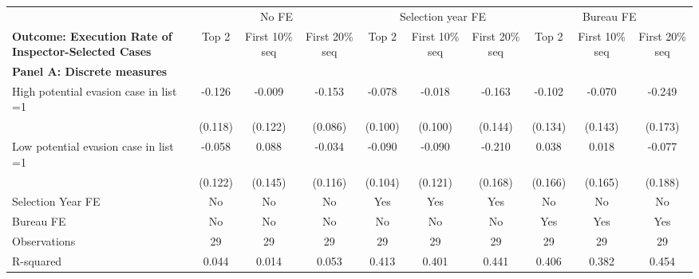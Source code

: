 \begin{tabular}{l*{9}{c}} \toprule
            &\multicolumn{3}{c}{No FE}                                        &\multicolumn{3}{c}{Selection year FE}                            &\multicolumn{3}{c}{Bureau FE}                                    \\\cmidrule(lr){2-4}\cmidrule(lr){5-7}\cmidrule(lr){8-10}
\multicolumn{1}{l}{\textbf{Outcome: Execution Rate of Inspector-Selected Cases}} & Top 2 & First 10\% seq & First 20\% seq & Top 2 & First 10\% seq & First 20\% seq & Top 2 & First 10\% seq & First 20\% seq \\ \midrule \multicolumn{10}{l}{\textbf{Panel A: Discrete measures}}\\ \addlinespace
High potential evasion case in list =1&      -0.126         &      -0.009         &      -0.153\sym{*}  &      -0.078         &      -0.018         &      -0.163         &      -0.102         &      -0.070         &      -0.249         \\
            &     (0.118)         &     (0.122)         &     (0.086)         &     (0.100)         &     (0.100)         &     (0.144)         &     (0.134)         &     (0.143)         &     (0.173)         \\
\addlinespace
Low potential evasion case in list =1&      -0.058         &       0.088         &      -0.034         &      -0.090         &      -0.090         &      -0.210         &       0.038         &       0.018         &      -0.077         \\
            &     (0.122)         &     (0.145)         &     (0.116)         &     (0.104)         &     (0.121)         &     (0.168)         &     (0.166)         &     (0.165)         &     (0.188)         \\
\midrule
Selection Year FE&          No         &          No         &          No         &         Yes         &         Yes         &         Yes         &          No         &          No         &          No         \\
Bureau FE   &          No         &          No         &          No         &          No         &          No         &          No         &         Yes         &         Yes         &         Yes         \\
Observations&          29         &          29         &          29         &          29         &          29         &          29         &          29         &          29         &          29         \\
R-squared   &       0.044         &       0.014         &       0.053         &       0.413         &       0.401         &       0.441         &       0.406         &       0.382         &       0.454         \\


\end{tabular}
